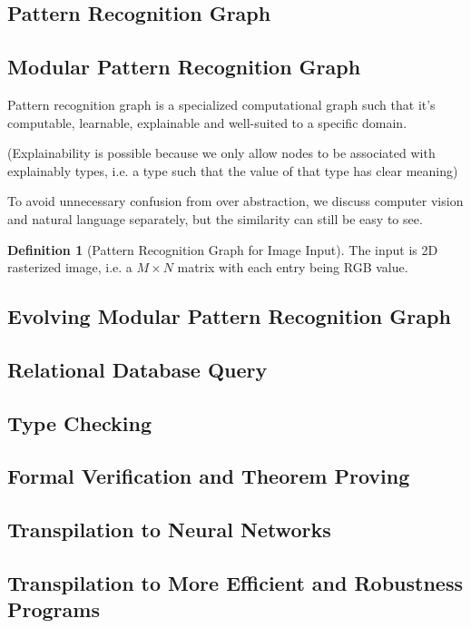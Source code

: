 \documentclass[11pt, oneside]{article}   	%
\theoremstyle{definition}
\newtheorem*{defn}{Definition}
\begin{document}
\subsection{Pattern Recognition Graph}

\subsection{Modular Pattern Recognition Graph}

Pattern recognition graph is a specialized computational graph such that it's computable, learnable, explainable and well-suited to a specific domain.

(Explainability is possible because we only allow nodes to be associated with explainably types, i.e. a type such that the value of that type has clear meaning)

To avoid unnecessary confusion from over abstraction, we discuss computer vision and natural language separately, but the similarity can still be easy to see.

\begin{defn}[Pattern Recognition Graph for Image Input]
	The input is 2D rasterized image, i.e. a $M\times N$ matrix with each entry being RGB value.
\end{defn}

\subsection{Evolving Modular Pattern Recognition Graph}

\subsection{Relational Database Query}


\subsection{Type Checking}

\subsection{Formal Verification and Theorem Proving}

\subsection{Transpilation to Neural Networks}

\subsection{Transpilation to More Efficient and Robustness Programs}
\end{document}
